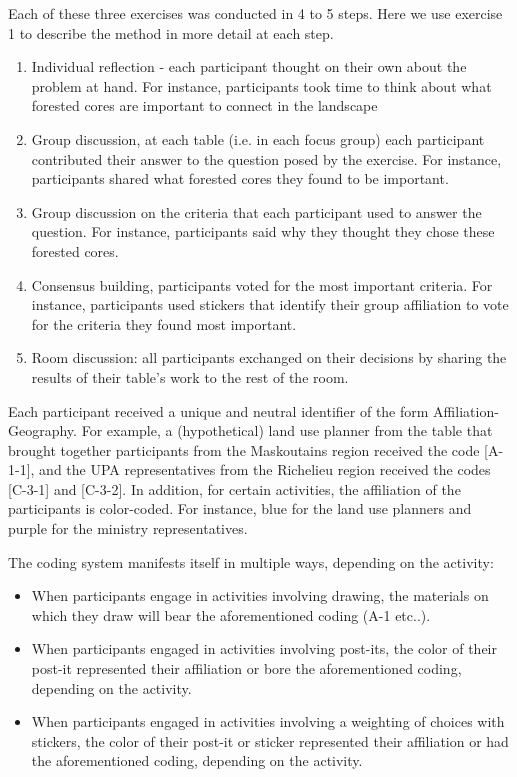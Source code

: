 Each of these three exercises was conducted in 4 to 5 steps. Here we use exercise 1 to describe the method in more detail at each step.

\begin{enumerate}
\item Individual reflection - each participant thought on their own about the problem at hand. For instance, participants took time to think about what forested cores are important to connect in the landscape
\item Group discussion, at each table (i.e. in each focus group) each participant contributed their answer to the question posed by the exercise. For instance, participants shared what forested cores they found to be important.
\item Group discussion on the criteria that each participant used to answer the question. For instance, participants said why they thought they chose these forested cores.
\item Consensus building, participants voted for the most important criteria. For instance, participants used stickers that identify their group affiliation to vote for the criteria they found most important.
\item Room discussion: all participants exchanged on their decisions by sharing the results of their table’s work to the rest of the room.
\end{enumerate}

Each participant received a unique and neutral identifier of the form Affiliation-Geography. For example, a (hypothetical) land use planner from the table that brought together participants from the Maskoutains region received the code [A-1-1], and the UPA representatives from the Richelieu region received the codes [C-3-1] and [C-3-2]. In addition, for certain activities, the affiliation of the participants is color-coded. For instance, blue for the land use planners and purple for the ministry representatives.

The coding system manifests itself in multiple ways, depending on the activity:
\begin{itemize}
\item When participants engage in activities involving drawing, the materials on which they draw will bear the aforementioned coding (A-1 etc..).
\item When participants engaged in activities involving post-its, the color of their post-it represented their affiliation or bore the aforementioned coding, depending on the activity.
\item When participants engaged in activities involving a weighting of choices with stickers, the color of their post-it or sticker represented their affiliation or had the aforementioned coding, depending on the activity.
\end{itemize}

